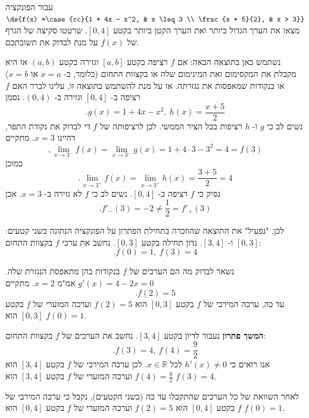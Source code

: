 עבור הפונקציה $\ds{f(x) =\case{cc}{1 + 4x - x^2, & x \leq 3 \\ \frac{x + 5}{2}, & x > 3}}$ מצאו את הערך הגדול ביותר ואת הערך הקטן ביותר בקטע \([0, 4]\). שרטטו סקיצה של הגרף של \(f(x)\) על מנת לבדוק את תשובתכם.
\begin{solbox}
נשתמש כאן בתוצאה הבאה: אם
$f$
רציפה בקטע
$[a,b]$
וגזירה בקטע
$(a,b)$
אז היא מקבלת את המקסימום ואת המינימום שלה או בקצוות התחום
(כלומר, ב-
$x=a$
או
$x=b$)
או בנקודות שמאפסות את נגזרתה.
אז על מנת להשתמש בתוצאה זו, עלינו לברר האם
$f$
רציפה ב-
$[0,4]$
וגזירה ב-
$(0,4)$.
נסמן
$$.g(x)=1+4x-x^2,\ h(x)=\frac{x+5}{2}$$
נשים לב כי
$g$
ו-
$h$
רציפות בכל הציר הממשי. לכן לרציפותה של
$f$
די לבדוק את נקודת התפר, דהיינו
$x=3$.
מתקיים
$$,\lim_{x\to3^-}f(x)=\lim_{x\to3^-}g(x)=1+4\cdot3-3^2=4=f(3)$$
כמוכן
$$.\lim_{x\to3^+}f(x)=\lim_{x\to3^+}h(x)=\frac{3+5}{2}=4$$
נסיק כי
$f$
רציפה ב-
$[0,4]$.
נשים לב כי
$f$
לא גזירה ב-
$x=3$.
אכן
$$.f'_{-}(3)=-2\neq\frac{1}{2}=f'_{+}(3)$$

לכן, "נפעיל" את התוצאה שהוזכרה בתחילת הפתרון על הפונקציה הנתונה בשני קטעים:
$[0,3]$
ו-
$[3,4]$.
נדון תחילה בקטע
$[0,3]$.
נחשב את ערכי
$f$
בקצוות התחום:
$$.f(0)=1,\ f(3)=4$$

נשאר לבדוק מה הם הערכים של
$f$
בנקודות בהן מתאפסת הנגזרת שלה.
$g'(x)=4-2x=0$
אמ"מ
$x=2$.
מתקיים
$$.f(2)=5$$
עד כה, ערכה המירבי של
$f$
בקטע
$[0,3]$
הוא
$f(2)=5$
וערכה המזערי של
$f$
בקטע
$[0,3]$
הוא
$f(0)=1$.
\end{solbox}

\begin{solbox}
\textbf{המשך פתרון}
נעבור לדיון בקטע
$[3,4]$.
נחשב את הערכים של
$f$
בקצוות התחום:
$$.f(3)=4,\ f(4)=\frac{9}{2}$$
אנו רואים כי
$h'(x)\neq 0$
לכל
$x\in\mathbb{R}$.
לכן ערכה המירבי של
$f$
בקטע
$[3,4]$
הוא
$f(4)=\frac{9}{2}$
וערכה המזערי של
$f$
בקטע
$[3,4]$
הוא
$f(3)=4$.

לאחר השוואת של כל הערכים שהתקבלו עד כה
(בשני הקטעים),
נקבל כי
ערכה המירבי של
$f$
בקטע
$[0,4]$
הוא
$f(2)=5$
וערכה המזערי של
$f$
בקטע
$[0,4]$
הוא
$f(0)=1$.
\end{solbox}
